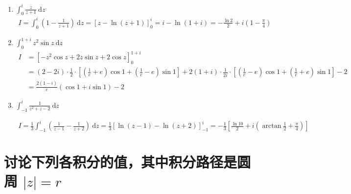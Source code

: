 \documentclass[UTF8]{report}
\theoremstyle{MyLineTheoremStyle} %
\theoremstyle{MyBlockTheoremStyle} %
\theoremstyle{MySubsubsectionStyle} %
\begin{document}
\begin{enumerate}
\item $\displaystyle \int_{0}^{i} \frac{z}{z + 1} \  \mathrm{d} z$
\begin{gather}
I 
= \int_{0}^{i} \left( 1 - \frac{1}{z+1} \right) \  \mathrm{d} z = \left[ z - \ln (z+1) \right]_{0}^{i} = i - \ln (1+i) = - \frac{\ln 2}{2} + i\left( 1 - \frac{\pi}{4} \right)
\end{gather}

\item $\displaystyle \int_{0}^{1+i} z^2 \sin z \ \mathrm{d} z$
\begin{align*}
I &= \left[ - z^2 \cos z + 2z \sin z + 2 \cos z \right]_{0}^{1+i} 
\\ 
&= (2 - 2i)\cdot \frac{1}{2} \cdot \left[ \left(\frac{1}{e} + e \right)\cos 1 + \left(\frac{1}{e} - e \right)\sin 1 \right] + 2( 1 + i)\cdot\frac{1}{2i}\cdot  \left[ \left(\frac{1}{e} - e \right)\cos 1 + \left(\frac{1}{e} + e \right)\sin 1 \right] - 2
\\ 
&= \frac{2 (1 - i)}{e}(\cos 1 + i \sin 1) - 2
\end{align*}



\item $\displaystyle \int_{-1}^{i} \frac{1}{z^2 + z-2} \ \mathrm{d}z$

\begin{align}
I 
= \frac{1}{3} \int_{-1}^{i} \left( \frac{1}{z - 1} - \frac{1}{ z + 2} \right) \ \mathrm{d}z 
= \frac{1}{3} \left[ \ln (z - 1) - \ln (z + 2) \right]_{-1}^{i} 
= -\frac{1}{3}\left[  \frac{\ln 10}{2} + i\left( \arctan \frac{1}{2} + \frac{\pi}{4} \right) \right]
\end{align}

\end{enumerate}

\section{讨论下列各积分的值，其中积分路径是圆周 $| z | = r$}
\end{document}
